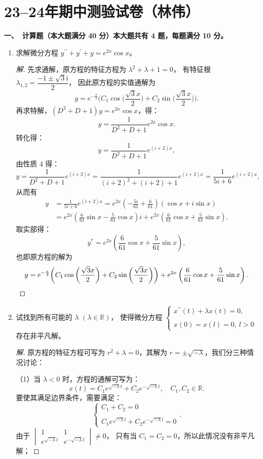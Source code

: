 \section{23--24年期中测验试卷（林伟）}
\textbf{一、\ 计算题（本大题满分 40 分）本大题共有 4 题，每题满分 10 分。}
\begin{enumerate}
\item 求解微分方程 $y^{\prime \prime}+y^{\prime}+y=e^{2x} \cos x$。
\begin{proof}[解]先求通解，原方程的特征方程为 $\lambda^{2}+\lambda+1=0$，
有特征根 $\lambda_{1,2}=\dfrac{-1 \pm \sqrt{3} \mathrm{i}}{2}$，
因此原方程的实值通解为
\[y=e^{-\frac{x}{2}}\bigg(C_{1} \cos\bigg(\frac{\sqrt{3}x}{2}\bigg)
+C_{2} \sin\bigg(\frac{\sqrt{3}x}{2}\bigg)\bigg).\]
再求特解，$(D^{2}+D+1)y=e^{2x} \cos x$，得：
\[y=\frac{1}{D^{2}+D+1} e^{2x} \cos x.\]
转化得：\[y=\dfrac{1}{D^{2}+D+1} e^{(i+2)x},\]
由性质 4 得：\[y=\frac{1}{D^{2}+D+1} e^{(i+2)x}
=\frac{1}{(i+2)^{2}+(i+2)+1} e^{(i+2)x}=\frac{1}{5i+6} e^{(i+2)x},\]
从而有
\begin{align*}
y & =\frac{1}{5i+6} e^{(i+2)x}=e^{2x}\left(-\frac{5i}{61}+\frac{6}{61}\right)(\cos x+i\sin x) \\
& =e^{2x}\left(\frac{6}{61} \sin x-\frac{5}{61} \cos x\right) i+e^{2x}\left(\frac{6}{61} \cos x+\frac{5}{61} \sin x\right).
\end{align*}
取实部得：
\[y^{*}=e^{2x}\left(\frac{6}{61} \cos x+\frac{5}{61} \sin x\right),\]
也即原方程的解为
\[y=e^{-\frac{x}{2}}\bigg(C_{1} \cos \bigg(\frac{\sqrt{3}x}{2}\bigg)
+C_{2} \sin \bigg(\frac{\sqrt{3}x}{2}\bigg)\bigg)
+e^{2x}\left(\frac{6}{61} \cos x+\frac{5}{61} \sin x\right).\qedhere\]
\end{proof}
\item 试找到所有可能的 $\lambda$ $(\lambda \in \mathbb{R})$，
使得微分方程 $\begin{cases}x^{\prime \prime}(t)+\lambda x(t)=0, \\ \\ x(0)=x(l)=0,\ l>0 \end{cases}$ 存在非平凡解。
\begin{proof}[解]
原方程的特征方程可写为 $r^{2}+\lambda=0$，其解为 $r= \pm \sqrt{-\lambda}$，我们分三种情况讨论：

（1）当 $\lambda<0$ 时，方程的通解可写为：
\[x(t)=C_{1} e^{\sqrt{-\lambda}t}+C_{2} e^{-\sqrt{-\lambda}t}, \quad C_{1}, C_{2} \in \mathbb{R}.\]
要使其满足边界条件，需要满足：
\[\begin{cases}C_{1}+C_{2}=0 \\ \\ C_{1} e^{\sqrt{-\lambda}l}+C_{2} e^{-\sqrt{-\lambda}l}=0\end{cases}.\]
由于 $\begin{vmatrix}1 & 1 \\ e^{\sqrt{-\lambda}l} & e^{-\sqrt{-\lambda}l}\end{vmatrix} \neq 0$，
只有当 $C_{1}=C_{2}=0$，所以此情况没有非平凡解；


\end{proof}
\end{enumerate}
